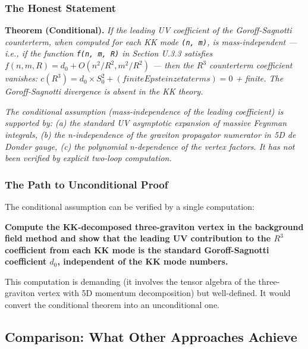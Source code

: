 \documentclass[aps,prd,preprint,superscriptaddress,longbibliography,floatfix]{revtex4-2}
\theoremstyle{remark}
\begin{document}
\subsubsection{The Honest Statement}

\textbf{Theorem (Conditional).} \textit{If the leading UV coefficient of the Goroff-Sagnotti counterterm, when computed for each KK mode \texttt{(n, m)}, is mass-independent --- i.e., if the function \texttt{f(n, m, R)} in Section U.3.3 satisfies $f(n, m, R) = d_{0} + O(n^{2}/R^{2}, m^{2}/R^{2})$ --- then the $R^{3}$ counterterm coefficient vanishes: $c(R^{3}) = d_{0} \times S_{0}^{2} + (finite Epstein zeta terms) = 0$ + finite. The Goroff-Sagnotti divergence is absent in the KK theory.}

\textit{The conditional assumption (mass-independence of the leading coefficient) is supported by: (a) the standard UV asymptotic expansion of massive Feynman integrals, (b) the n-independence of the graviton propagator numerator in 5D de Donder gauge, (c) the polynomial n-dependence of the vertex factors. It has not been verified by explicit two-loop computation.}


\subsubsection{The Path to Unconditional Proof}

The conditional assumption can be verified by a single computation:

\textbf{Compute the KK-decomposed three-graviton vertex in the background field method and show that the leading UV contribution to the $R^{3}$ coefficient from each KK mode is the standard Goroff-Sagnotti coefficient $d_{0}$, independent of the KK mode numbers.}

This computation is demanding (it involves the tensor algebra of the three-graviton vertex with 5D momentum decomposition) but well-defined. It would convert the conditional theorem into an unconditional one.



\subsection{Comparison: What Other Approaches Achieve}
\end{document}
